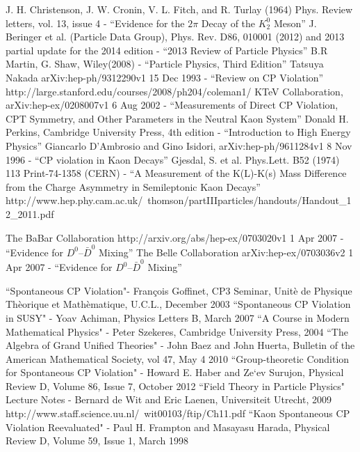 \documentclass[floatfix,aps,prd,amsmath,amssymb]{revtex4}
\begin{document}
\begin{thebibliography}{10}
J. H. Christenson, J. W. Cronin, V. L. Fitch, and R. Turlay (1964) Phys. Review letters, vol. 13, issue 4 - ``Evidence for the $2 \pi$ Decay of the $K^0_2$ Meson'' 
J. Beringer et al. (Particle Data Group), Phys. Rev. D86, 010001 (2012) and 2013 partial update for the 2014 edition - ``2013 Review of Particle Physics'' 
B.R Martin, G. Shaw, Wiley(2008) - ``Particle Physics, Third Edition'' 
Tatsuya Nakada arXiv:hep-ph/9312290v1 15 Dec 1993 - ``Review on CP Violation''
http://large.stanford.edu/courses/2008/ph204/coleman1/  
KTeV Collaboration, arXiv:hep-ex/0208007v1 6 Aug 2002 - ``Measurements of Direct CP Violation, CPT Symmetry, and Other Parameters in the Neutral Kaon System'' 
Donald H. Perkins, Cambridge University Press, 4th edition - ``Introduction to High Energy Physics'' 
Giancarlo D’Ambrosio and Gino Isidori, arXiv:hep-ph/9611284v1 8 Nov 1996 - ``CP violation in Kaon Decays'' 
Gjesdal, S. et al. Phys.Lett. B52 (1974) 113 Print-74-1358 (CERN) - ``A Measurement of the K(L)-K(s) Mass Difference from the Charge Asymmetry in Semileptonic Kaon Decays'' 
http://www.hep.phy.cam.ac.uk/~thomson/partIIIparticles/handouts/Handout\_12\_2011.pdf

The BaBar Collaboration http://arxiv.org/abs/hep-ex/0703020v1 1 Apr 2007 - ``Evidence for $D^{0}–\bar{D}^{0}$ Mixing''
The Belle Collaboration arXiv:hep-ex/0703036v2 1 Apr 2007 - ``Evidence for $D^{0}–\bar{D}^{0}$ Mixing''

``Spontaneous CP Violation"- Fran\c{c}ois Goffinet, CP3 Seminar, Unit\`{e} de Physique Th\`{e}orique et Math\`{e}matique, U.C.L., December 2003
``Spontaneous CP Violation in SUSY" - Yoav Achiman, Physics Letters B, March 2007
``A Course in Modern Mathematical Physics" - Peter Szekeres, Cambridge University Press, 2004
``The Algebra of Grand Unified Theories" - John Baez and John Huerta, Bulletin of the American Mathematical Society, vol 47, May 4 2010
 ``Group-theoretic Condition for Spontaneous CP Violation" - Howard E. Haber and Ze`ev Surujon, Physical Review D, Volume 86, Issue 7, October 2012
 ``Field Theory in Particle Physics" Lecture Notes -  Bernard de Wit and Eric Laenen, Universiteit Utrecht, 2009 http://www.staff.science.uu.nl/~wit00103/ftip/Ch11.pdf
``Kaon Spontaneous CP Violation Reevaluated" - Paul H. Frampton and Masayasu Harada, Physical Review D, Volume 59, Issue 1, March 1998


\end{thebibliography}
\end{document}
